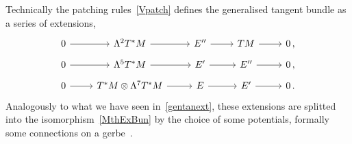 \documentclass[debug]{phd}
\begin{document}
						Technically the patching rules~\eqref{Vpatch} defines the generalised tangent bundle as a series of extensions,
								\begin{equation}
									\begin{tikzcd}[row sep=tiny]
										0 \arrow{r} &\Lambda^2 T^*M \arrow{r} &E'' \arrow{r} &TM \arrow{r} &0 	\, , \\
										0 \arrow{r} &\Lambda^5 T^*M \arrow{r} &E' \arrow{r} &E'' \arrow{r} &0 	\, , \\
										0 \arrow{r} &T^*M \otimes \Lambda^7 T^*M \arrow{r} &E \arrow{r} &E' \arrow{r} &0 \, .
									\end{tikzcd}
								\end{equation}
						Analogously to what we have seen in~\eqref{gentanext}, these extensions are splitted~\cite{Hatcher} into the isomorphism~\eqref{MthExBun} by the choice of some potentials, formally some connections on a gerbe~\cite{HitchinLagrangian}.
						
\end{document}
